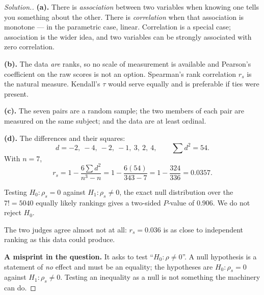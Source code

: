 \documentclass[11pt,a4paper]{article}
\theoremstyle{definition}
\newenvironment{solution}
  {\renewcommand{\qedsymbol}{}\begin{proof}[\textit{Solution}.]}
  {\end{proof}}
\begin{document}
\begin{solution}
\textbf{(a).} There is \emph{association} between two variables when knowing one
tells you something about the other. There is \emph{correlation} when that
association is monotone --- in the parametric case, linear. Correlation is a
special case; association is the wider idea, and two variables can be strongly
associated with zero correlation.

\textbf{(b).} The data \emph{are} ranks, so no scale of measurement is available
and Pearson's coefficient on the raw scores is not an option. Spearman's rank
correlation $r_s$ is the natural measure. Kendall's $\tau$ would serve equally
and is preferable if ties were present.

\textbf{(c).} The seven pairs are a random sample; the two members of each pair are
measured on the same subject; and the data are at least ordinal.

\textbf{(d).} The differences and their squares:
$$d = -2,\ -4,\ -2,\ -1,\ 3,\ 2,\ 4,
\qquad \sum d^{2} = 54 .$$
With $n = 7$,
$$r_s = 1 - \dfrac{6\sum d^{2}}{n^{3}-n}
= 1 - \dfrac{6(54)}{343-7} = 1 - \dfrac{324}{336} = 0.0357 .$$

Testing $H_0 : \rho_s = 0$ against $H_1 : \rho_s \neq 0$, the exact null
distribution over the $7! = 5040$ equally likely rankings gives a two-sided
$P$-value of $0.906$. We do not reject $H_0$.

The two judges agree almost not at all: $r_s = 0.036$ is as close to independent
ranking as this data could produce.

\textbf{A misprint in the question.} It asks to test ``$H_0 : \rho \neq 0$''. A
null hypothesis is a statement of \emph{no} effect and must be an equality; the
hypotheses are $H_0 : \rho_s = 0$ against $H_1 : \rho_s \neq 0$. Testing an
inequality as a null is not something the machinery can do.
\end{solution}
\end{document}
